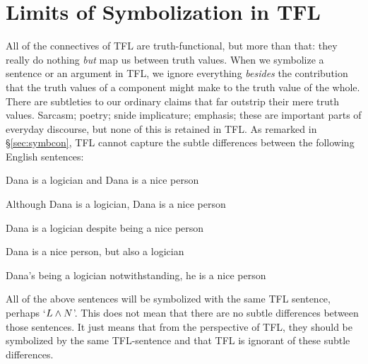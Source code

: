 %

\section{Limits of Symbolization in TFL}
All of the connectives of TFL are truth-functional, but more than that: they really do nothing \emph{but} map us between truth values. When we symbolize a sentence or an argument in TFL, we ignore everything \emph{besides} the contribution that the truth values of a component might make to the truth value of the whole. There are subtleties to our ordinary claims that far outstrip their mere truth values. Sarcasm; poetry; snide implicature; emphasis; these are important parts of everyday discourse, but none of this is retained in TFL. As remarked in \S\ref{sec:symbcon}, TFL cannot capture the subtle differences between the following English sentences:
	\begin{earg}
		\item Dana is a logician and Dana is a nice person
		\item Although Dana is a logician, Dana is a nice person
		\item Dana is a logician despite being a nice person
		\item Dana is a nice person, but also a logician
		\item Dana's being a logician notwithstanding, he is a nice person
	\end{earg}
All of the above sentences will be symbolized with the same TFL sentence, perhaps `$L \mathbin{\wedge} N$'. This does not mean that there are no subtle differences between those sentences. It just means that from the perspective of TFL, they should be symbolized by the same TFL-sentence and that TFL is ignorant of these subtle differences.

